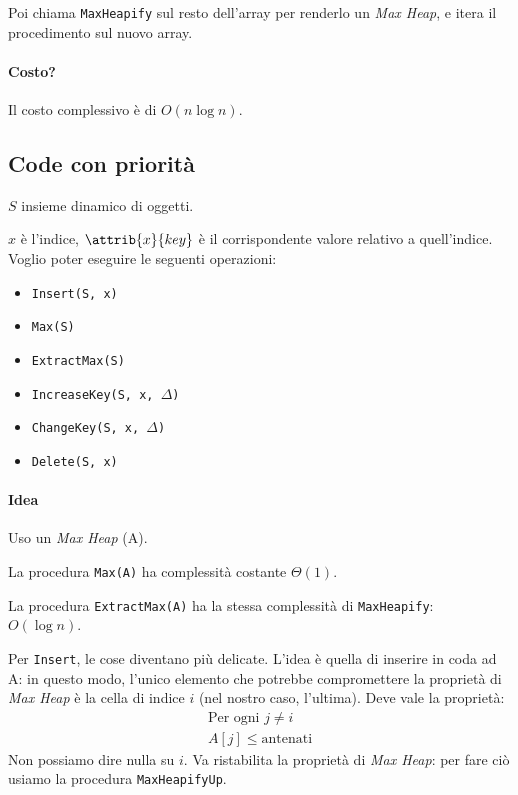Poi chiama \texttt{MaxHeapify} sul resto dell'array per renderlo un \emph{Max Heap}, e itera il procedimento 
sul nuovo array.



\paragraph{Costo?} Il costo complessivo è di $O(n \log n)$.

\subsection{Code con priorità} \label{codeconpriorita}
$S$ insieme dinamico di oggetti. \par
$x$ è l'indice, $\attrib{x}{key}$ è il corrispondente valore relativo a quell'indice.
Voglio poter eseguire le seguenti operazioni:
\begin{itemize}[noitemsep]
	\item \texttt{Insert(S, x)}
	\item \texttt{Max(S)}
	\item \texttt{ExtractMax(S)}
	\item \texttt{IncreaseKey(S, x, $\Delta$)}
	\item \texttt{ChangeKey(S, x, $\Delta$)}
	\item \texttt{Delete(S, x)}
\end{itemize}
\paragraph{Idea} Uso un \emph{Max Heap} (A).


La procedura \texttt{Max(A)} ha complessità costante $\Theta (1)$.


La procedura \texttt{ExtractMax(A)} ha la stessa complessità di \texttt{MaxHeapify}: \\
$O(\log n)$.
\bigskip

Per \texttt{Insert}, le cose diventano più delicate. L'idea è quella di inserire
in coda ad A: in questo modo, l'unico elemento che potrebbe compromettere la proprietà di 
\emph{Max Heap} è la cella di indice $i$ (nel nostro caso, l'ultima). Deve vale la proprietà:
\begin{gather*}
	\text{Per ogni } j \neq i \\
	A[j] \leq \text{antenati}
\end{gather*}
Non possiamo dire nulla su $i$. Va ristabilita la proprietà di \emph{Max Heap}: per fare ciò 
usiamo la procedura \texttt{MaxHeapifyUp}.


